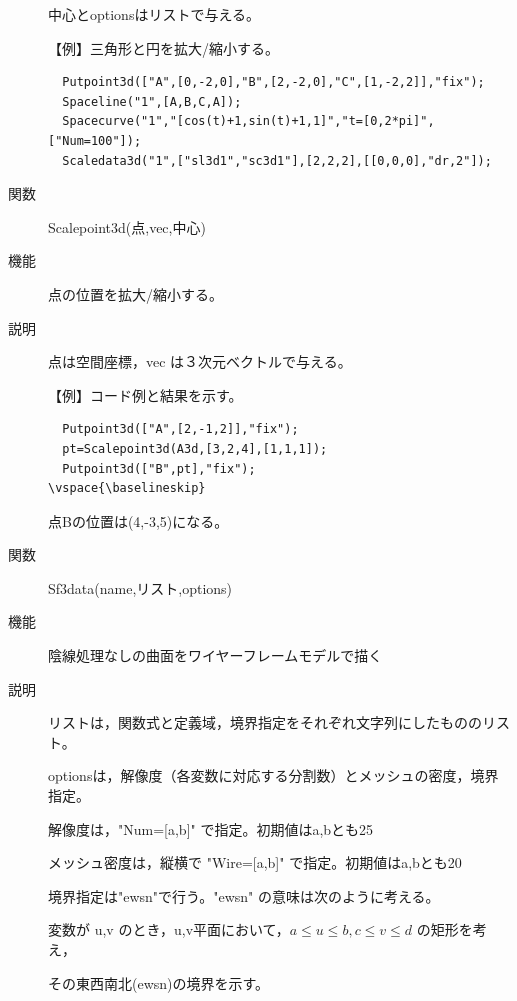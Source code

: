 \documentclass[papersize,a4paper,12pt,uplatex]{jsarticle}
\begin{document}
\begin{description}
中心とoptionsはリストで与える。

\vspace{\baselineskip}
【例】三角形と円を拡大/縮小する。

\begin{verbatim}
  Putpoint3d(["A",[0,-2,0],"B",[2,-2,0],"C",[1,-2,2]],"fix");
  Spaceline("1",[A,B,C,A]);
  Spacecurve("1","[cos(t)+1,sin(t)+1,1]","t=[0,2*pi]",["Num=100"]);
  Scaledata3d("1",["sl3d1","sc3d1"],[2,2,2],[[0,0,0],"dr,2"]);
\end{verbatim}

\hspace{20mm}

\vspace{\baselineskip}
\hypertarget{scalepoint3d}{}
\item[関数]  Scalepoint3d(点,vec,中心)
\item[機能]  点の位置を拡大/縮小する。
\item[説明]  点は空間座標，vec は３次元ベクトルで与える。

\vspace{\baselineskip}
【例】コード例と結果を示す。

\begin{verbatim}
  Putpoint3d(["A",[2,-1,2]],"fix");
  pt=Scalepoint3d(A3d,[3,2,4],[1,1,1]); 
  Putpoint3d(["B",pt],"fix");
\vspace{\baselineskip}
\end{verbatim}

点Bの位置は(4,-3,5)になる。
\vspace{\baselineskip}
\hypertarget{sf3data}{}
\item[関数]  Sf3data(name,リスト,options)
\item[機能]  陰線処理なしの曲面をワイヤーフレームモデルで描く
\item[説明]  リストは，関数式と定義域，境界指定をそれぞれ文字列にしたもののリスト。

optionsは，解像度（各変数に対応する分割数）とメッシュの密度，境界指定。

解像度は，"Num=[a,b]" で指定。初期値はa,bとも25

メッシュ密度は，縦横で "Wire=[a,b]" で指定。初期値はa,bとも20

境界指定は"ewsn"で行う。"ewsn" の意味は次のように考える。

変数が u,v のとき，u,v平面において，$a \leq u \leq b,c \leq v \leq d$ の矩形を考え，

その東西南北(ewsn)の境界を示す。


\end{description}
\end{document}
